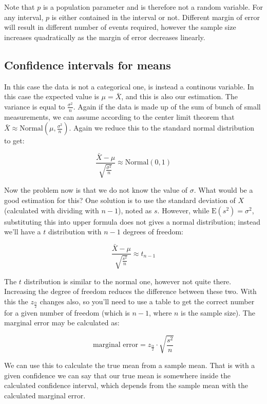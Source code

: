 Note that $p$ is a population parameter and is therefore not a random variable.
For any interval, $p$ is either contained in the interval or not. Different
margin of error will result in different number of events required, however the
sample size increases quadratically as the margin of error decreases linearly.

\subsection{Confidence intervals for means}

In this case the data is not a categorical one, is instead a continous variable.
In this case the expected value is $\mu = \bar{X}$, and this is also our
estimation. The variance is equal to $\frac{\sigma^2}{n}$. Again if the data is
made up of the sum of bunch of small measurements, we can assume according
to the center limit theorem that $\bar{X} \approx \mbox{Normal}\left(\mu,
\frac{\sigma^2}{n}\right).$ Again we reduce this to the standard normal
distribution to get:

\[ \frac{\bar{X}-\mu}{\sqrt{\frac{\sigma^2}{n}}}  \approx \mbox{Normal}
\left( 0, 1\right)
\]

Now the problem now is that we do not know the value of $\sigma$. What would be
a good estimation for this? One solution is to use the standard deviation of $X$
(calculated with dividing with $n-1$), noted as $s$. However, while
$\mbox{E}(s^2)=\sigma^2$, substituting this into upper formula does not gives a
normal distribution; instead we'll have a $t$ distribution with $n-1$ degrees of
freedom:


\[ \frac{\bar{X}-\mu}{\sqrt{\frac{s^2}{n}}}  \approx t_{n-1}
\]

The $t$ distribution is similar to the normal one, however not quite there.
Increasing the degree of freedom reduces the difference between these two.
With this the $z_{\frac{\alpha}{2}}$ changes also, so you'll need to use a table
to get the correct number for a given number of freedom (which is $n-1$, where $n$ is
the sample size). The marginal error may be calculated as:

\[ \mbox{marginal error}= z_{\frac{\alpha}{2}} \cdot \sqrt{\frac{s^2}{n}} \]

We can use this to calculate the true mean from a sample mean. That is with a
given confidence we can say that our true mean is somewhere inside the
calculated confidence interval, which depends from the sample mean with the
calculated marginal error.

